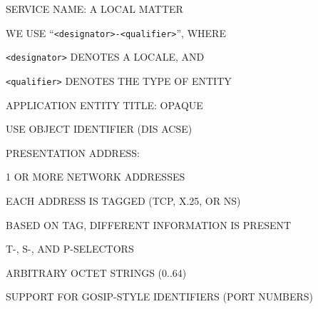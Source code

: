 \begin{bwslide}

\begin{nrtc}
\item	SERVICE NAME: A LOCAL MATTER
    \begin{nrtc}
    \item	WE USE ``\verb"<designator>-<qualifier>"'', WHERE

    \item	\verb"<designator>" DENOTES A LOCALE, AND

    \item	\verb"<qualifier>" DENOTES THE TYPE OF ENTITY
    \end{nrtc}

\item	APPLICATION ENTITY TITLE: OPAQUE
    \begin{nrtc}
    \item	USE OBJECT IDENTIFIER (DIS ACSE)
    \end{nrtc}

\item	PRESENTATION ADDRESS:
    \begin{nrtc}
    \item	1 OR MORE NETWORK ADDRESSES
	\begin{nrtc}
	\item	EACH ADDRESS IS TAGGED (TCP, X.25, OR NS)

	\item	BASED ON TAG, DIFFERENT INFORMATION IS PRESENT
	\end{nrtc}

    \item	T-, S-, AND P-SELECTORS
	\begin{nrtc}
	\item	ARBITRARY OCTET STRINGS (0..64)

	\item	SUPPORT FOR GOSIP-STYLE IDENTIFIERS (PORT NUMBERS)
	\end{nrtc}
    \end{nrtc}
\end{nrtc}
\end{bwslide}




